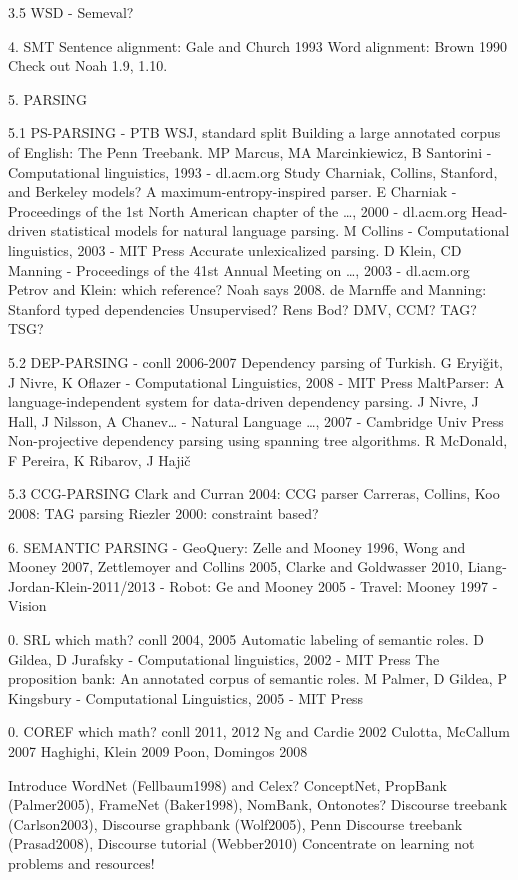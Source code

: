 3.5 WSD
- Semeval?

4. SMT
Sentence alignment: Gale and Church 1993
Word alignment: Brown 1990
Check out Noah 1.9, 1.10.

5. PARSING

5.1 PS-PARSING
- PTB WSJ, standard split
Building a large annotated corpus of English: The Penn Treebank.  MP Marcus, MA Marcinkiewicz, B Santorini - Computational linguistics, 1993 - dl.acm.org
Study Charniak, Collins, Stanford, and Berkeley models?
A maximum-entropy-inspired parser. E Charniak - Proceedings of the 1st North American chapter of the …, 2000 - dl.acm.org
Head-driven statistical models for natural language parsing.  M Collins - Computational linguistics, 2003 - MIT Press
Accurate unlexicalized parsing.  D Klein, CD Manning - Proceedings of the 41st Annual Meeting on …, 2003 - dl.acm.org
Petrov and Klein: which reference?  Noah says 2008.
de Marnffe and Manning: Stanford typed dependencies
Unsupervised?  Rens Bod?  DMV, CCM?
TAG?  TSG?

5.2 DEP-PARSING
- conll 2006-2007
Dependency parsing of Turkish. G Eryiğit, J Nivre, K Oflazer - Computational Linguistics, 2008 - MIT Press
MaltParser: A language-independent system for data-driven dependency parsing.  J Nivre, J Hall, J Nilsson, A Chanev… - Natural Language …, 2007 - Cambridge Univ Press
Non-projective dependency parsing using spanning tree algorithms. R McDonald, F Pereira, K Ribarov, J Hajič

5.3 CCG-PARSING
Clark and Curran 2004: CCG parser
Carreras, Collins, Koo 2008: TAG parsing
Riezler 2000: constraint based?

6. SEMANTIC PARSING
- GeoQuery: Zelle and Mooney 1996, Wong and Mooney 2007, Zettlemoyer and Collins 2005, Clarke and Goldwasser 2010, Liang-Jordan-Klein-2011/2013
- Robot: Ge and Mooney 2005
- Travel: Mooney 1997
- Vision

0. SRL
which math?
conll 2004, 2005
Automatic labeling of semantic roles.  D Gildea, D Jurafsky - Computational linguistics, 2002 - MIT Press
The proposition bank: An annotated corpus of semantic roles. M Palmer, D Gildea, P Kingsbury - Computational Linguistics, 2005 - MIT Press


0. COREF
which math?
conll 2011, 2012
Ng and Cardie 2002
Culotta, McCallum 2007
Haghighi, Klein 2009
Poon, Domingos 2008

Introduce WordNet (Fellbaum1998) and Celex?
ConceptNet, PropBank (Palmer2005), FrameNet (Baker1998), NomBank, Ontonotes?
Discourse treebank (Carlson2003), Discourse graphbank (Wolf2005), Penn Discourse treebank (Prasad2008), Discourse tutorial (Webber2010)
Concentrate on learning not problems and resources!

